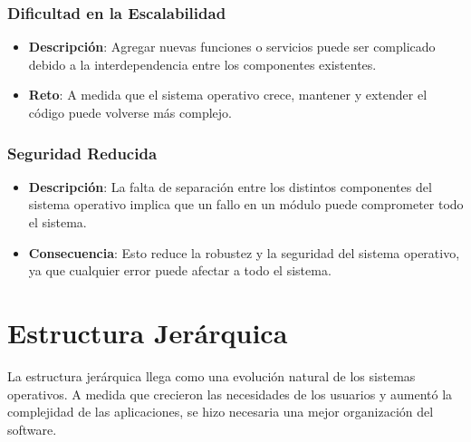 \begin{tcolorbox}
	
\subsubsection{Dificultad en la Escalabilidad}
\begin{itemize}
	\item \textbf{Descripción}: Agregar nuevas funciones o servicios puede ser complicado debido a la interdependencia entre los componentes existentes.
	\item \textbf{Reto}: A medida que el sistema operativo crece, mantener y extender el código puede volverse más complejo.
\end{itemize}

\end{tcolorbox}

\begin{tcolorbox}
\subsubsection{Seguridad Reducida}
\begin{itemize}
	\item \textbf{Descripción}: La falta de separación entre los distintos componentes del sistema operativo implica que un fallo en un módulo puede comprometer todo el sistema.
	\item \textbf{Consecuencia}: Esto reduce la robustez y la seguridad del sistema operativo, ya que cualquier error puede afectar a todo el sistema.
\end{itemize}
\end{tcolorbox}


\section{Estructura Jerárquica}



La estructura jerárquica llega como una evolución natural de los sistemas operativos. A medida que crecieron las necesidades de los usuarios y aumentó la complejidad de las aplicaciones, se hizo necesaria una mejor organización del software. 


